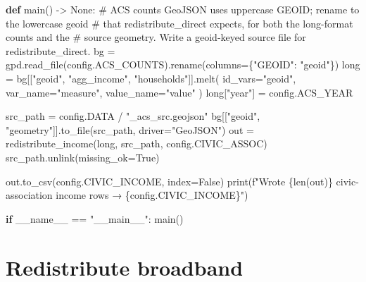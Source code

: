 \documentclass[
  letterpaper,
  DIV=11,
  numbers=noendperiod]{scrreprt}
\newenvironment{Shaded}{\begin{snugshade}}{\end{snugshade}}
\newcommand{\BuiltInTok}[1]{\textcolor[rgb]{0.00,0.23,0.31}{#1}}
\newcommand{\CommentTok}[1]{\textcolor[rgb]{0.37,0.37,0.37}{#1}}
\newcommand{\ControlFlowTok}[1]{\textcolor[rgb]{0.00,0.23,0.31}{\textbf{#1}}}
\newcommand{\KeywordTok}[1]{\textcolor[rgb]{0.00,0.23,0.31}{\textbf{#1}}}
\newcommand{\NormalTok}[1]{\textcolor[rgb]{0.00,0.23,0.31}{#1}}
\newcommand{\OperatorTok}[1]{\textcolor[rgb]{0.37,0.37,0.37}{#1}}
\newcommand{\SpecialCharTok}[1]{\textcolor[rgb]{0.37,0.37,0.37}{#1}}
\newcommand{\SpecialStringTok}[1]{\textcolor[rgb]{0.13,0.47,0.30}{#1}}
\newcommand{\StringTok}[1]{\textcolor[rgb]{0.13,0.47,0.30}{#1}}
\newcommand{\VariableTok}[1]{\textcolor[rgb]{0.07,0.07,0.07}{#1}}
\begin{document}
\begin{Shaded}
\begin{Highlighting}[]
\KeywordTok{def}\NormalTok{ main() }\OperatorTok{{-}\textgreater{}} \VariableTok{None}\NormalTok{:}
    \CommentTok{\# ACS counts GeoJSON uses uppercase GEOID; rename to the lowercase \textasciigrave{}geoid\textasciigrave{}}
    \CommentTok{\# that redistribute\_direct expects, for both the long{-}format counts and the}
    \CommentTok{\# source geometry. Write a geoid{-}keyed source file for redistribute\_direct.}
\NormalTok{    bg }\OperatorTok{=}\NormalTok{ gpd.read\_file(config.ACS\_COUNTS).rename(columns}\OperatorTok{=}\NormalTok{\{}\StringTok{"GEOID"}\NormalTok{: }\StringTok{"geoid"}\NormalTok{\})}
    \BuiltInTok{long} \OperatorTok{=}\NormalTok{ bg[[}\StringTok{"geoid"}\NormalTok{, }\StringTok{"agg\_income"}\NormalTok{, }\StringTok{"households"}\NormalTok{]].melt(}
\NormalTok{        id\_vars}\OperatorTok{=}\StringTok{"geoid"}\NormalTok{, var\_name}\OperatorTok{=}\StringTok{"measure"}\NormalTok{, value\_name}\OperatorTok{=}\StringTok{"value"}
\NormalTok{    )}
    \BuiltInTok{long}\NormalTok{[}\StringTok{"year"}\NormalTok{] }\OperatorTok{=}\NormalTok{ config.ACS\_YEAR}

\NormalTok{    src\_path }\OperatorTok{=}\NormalTok{ config.DATA }\OperatorTok{/} \StringTok{"\_acs\_src.geojson"}
\NormalTok{    bg[[}\StringTok{"geoid"}\NormalTok{, }\StringTok{"geometry"}\NormalTok{]].to\_file(src\_path, driver}\OperatorTok{=}\StringTok{"GeoJSON"}\NormalTok{)}
\NormalTok{    out }\OperatorTok{=}\NormalTok{ redistribute\_income(}\BuiltInTok{long}\NormalTok{, src\_path, config.CIVIC\_ASSOC)}
\NormalTok{    src\_path.unlink(missing\_ok}\OperatorTok{=}\VariableTok{True}\NormalTok{)}

\NormalTok{    out.to\_csv(config.CIVIC\_INCOME, index}\OperatorTok{=}\VariableTok{False}\NormalTok{)}
    \BuiltInTok{print}\NormalTok{(}\SpecialStringTok{f"Wrote }\SpecialCharTok{\{}\BuiltInTok{len}\NormalTok{(out)}\SpecialCharTok{\}}\SpecialStringTok{ civic{-}association income rows → }\SpecialCharTok{\{}\NormalTok{config}\SpecialCharTok{.}\NormalTok{CIVIC\_INCOME}\SpecialCharTok{\}}\SpecialStringTok{"}\NormalTok{)}


\ControlFlowTok{if} \VariableTok{\_\_name\_\_} \OperatorTok{==} \StringTok{"\_\_main\_\_"}\NormalTok{:}
\NormalTok{    main()}
\end{Highlighting}
\end{Shaded}

\section{Redistribute broadband}\label{redistribute-broadband}
\end{document}
